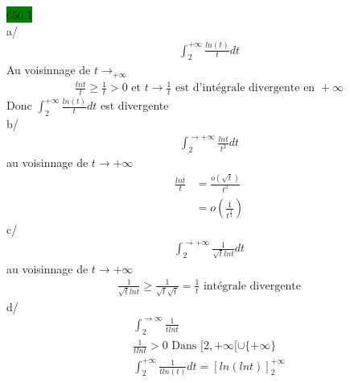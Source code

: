 \documentclass{article}
\begin{document}
\noindent \colorbox{green}{650.1}\\
a/ 
\begin{align*}
    \int_{2}^{+\infty} \frac{ln(t)}{t} dt 
\end{align*}
Au voisinnage de \(t \rightarrow_{+\infty}\) 
\begin{align*}
  \frac{lnt}{t}\geq \frac{1}{t} > 0 \text{ et } 
  t \rightarrow \frac{1}{t} \text{ est d'intégrale divergente en } + \infty
\end{align*}
Donc \(\int_{2}^{+\infty} \frac{ln(t)}{t}dt\) est divergente \\
b/ 
\begin{align*}
    \int_{2}^{\rightarrow +\infty} \frac{lnt}{t^{2}} dt 
\end{align*}
au voisinnage de \(t \rightarrow +\infty\)\\
\begin{align*}
  \frac{lnt}{t} &= \frac{o(\sqrt{t})}{t^{2}}\\
                &= o(\frac{1}{t^{\frac{3}{2}}})
\end{align*}
c/ 
\begin{align*}
    \int_{2}^{\rightarrow +\infty} \frac{1}{\sqrt{t}lnt}dt
\end{align*}
au voisinnage de \(t \rightarrow +\infty\)
\begin{align*}
  \frac{1}{\sqrt{t}lnt} \geq \frac{1}{\sqrt{t}\sqrt{t}} = \frac{1}{t} \text{ intégrale divergente}
\end{align*}
d/ 
\begin{align*}
    \int_{2}^{\rightarrow \infty} \frac{1}{t lnt}\\
    \frac{1}{t lnt} > 0 \text{ Dans } [2, +\infty[\cup \{+\infty\}\\
    \int_{2}^{+\infty} \frac{1}{t ln(t)}dt = [ln(lnt)]^{+\infty}_{2}
\end{align*}
\end{document}
